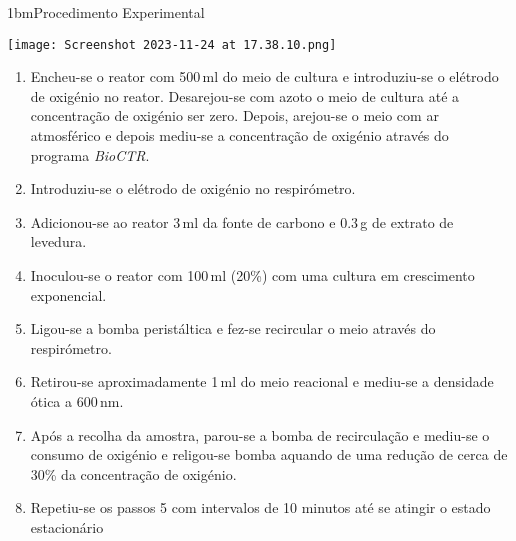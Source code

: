 \documentclass[\mainfilename]{subfiles}
\begin{document}
\begin{sectionBox}1bm{Procedimento Experimental} %
    \begin{center}
        \texttt{[image: Screenshot 2023-11-24 at 17.38.10.png]}
    \end{center}
    
    \begin{enumerate}
        \item Encheu-se o reator com 500\,\unit{\milli\litre} do meio de cultura e introduziu-se o elétrodo de oxigénio no reator. Desarejou-se com azoto o meio de cultura até a concentração de oxigénio ser zero. Depois, arejou-se o meio com ar atmosférico e depois mediu-se a concentração de oxigénio através do programa \textit{BioCTR}. 
        \item Introduziu-se o elétrodo de oxigénio no respirómetro. 
        \item Adicionou-se ao reator 3\,\unit{\milli\litre} da fonte de  carbono e 0.3\,\unit{\gram} de extrato de levedura. 
        \item Inoculou-se o reator com 100\,\unit{\milli\litre} (20\%) com uma cultura em crescimento exponencial.
        \item Ligou-se a bomba peristáltica e fez-se recircular o meio através do respirómetro. 
        \item Retirou-se aproximadamente 1\,\unit{\milli\litre} do meio reacional e mediu-se a densidade ótica a 600\,\unit{\nano\metre}. 
        \item Após a recolha da amostra, parou-se a bomba de recirculação e mediu-se o consumo de oxigénio e religou-se bomba aquando de uma redução de cerca de 30\% da concentração de oxigénio. 
        \item Repetiu-se os passos 5 com intervalos de 10 minutos até se atingir o estado estacionário
    \end{enumerate}


\end{sectionBox}
\end{document}
